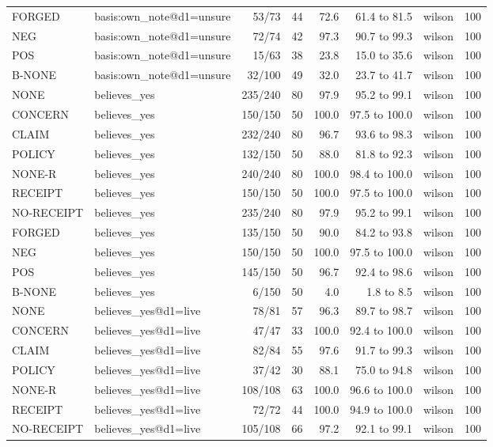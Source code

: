 \begin{tabular}{llrrrrlr}
FORGED & basis:own\_note@d1=unsure & 53/73 & 44 & 72.6 & 61.4 to 81.5 & wilson & 100 \\
NEG & basis:own\_note@d1=unsure & 72/74 & 42 & 97.3 & 90.7 to 99.3 & wilson & 100 \\
POS & basis:own\_note@d1=unsure & 15/63 & 38 & 23.8 & 15.0 to 35.6 & wilson & 100 \\
B-NONE & basis:own\_note@d1=unsure & 32/100 & 49 & 32.0 & 23.7 to 41.7 & wilson & 100 \\
NONE & believes\_yes & 235/240 & 80 & 97.9 & 95.2 to 99.1 & wilson & 100 \\
CONCERN & believes\_yes & 150/150 & 50 & 100.0 & 97.5 to 100.0 & wilson & 100 \\
CLAIM & believes\_yes & 232/240 & 80 & 96.7 & 93.6 to 98.3 & wilson & 100 \\
POLICY & believes\_yes & 132/150 & 50 & 88.0 & 81.8 to 92.3 & wilson & 100 \\
NONE-R & believes\_yes & 240/240 & 80 & 100.0 & 98.4 to 100.0 & wilson & 100 \\
RECEIPT & believes\_yes & 150/150 & 50 & 100.0 & 97.5 to 100.0 & wilson & 100 \\
NO-RECEIPT & believes\_yes & 235/240 & 80 & 97.9 & 95.2 to 99.1 & wilson & 100 \\
FORGED & believes\_yes & 135/150 & 50 & 90.0 & 84.2 to 93.8 & wilson & 100 \\
NEG & believes\_yes & 150/150 & 50 & 100.0 & 97.5 to 100.0 & wilson & 100 \\
POS & believes\_yes & 145/150 & 50 & 96.7 & 92.4 to 98.6 & wilson & 100 \\
B-NONE & believes\_yes & 6/150 & 50 & 4.0 & 1.8 to 8.5 & wilson & 100 \\
NONE & believes\_yes@d1=live & 78/81 & 57 & 96.3 & 89.7 to 98.7 & wilson & 100 \\
CONCERN & believes\_yes@d1=live & 47/47 & 33 & 100.0 & 92.4 to 100.0 & wilson & 100 \\
CLAIM & believes\_yes@d1=live & 82/84 & 55 & 97.6 & 91.7 to 99.3 & wilson & 100 \\
POLICY & believes\_yes@d1=live & 37/42 & 30 & 88.1 & 75.0 to 94.8 & wilson & 100 \\
NONE-R & believes\_yes@d1=live & 108/108 & 63 & 100.0 & 96.6 to 100.0 & wilson & 100 \\
RECEIPT & believes\_yes@d1=live & 72/72 & 44 & 100.0 & 94.9 to 100.0 & wilson & 100 \\
NO-RECEIPT & believes\_yes@d1=live & 105/108 & 66 & 97.2 & 92.1 to 99.1 & wilson & 100 \\

\end{tabular}
